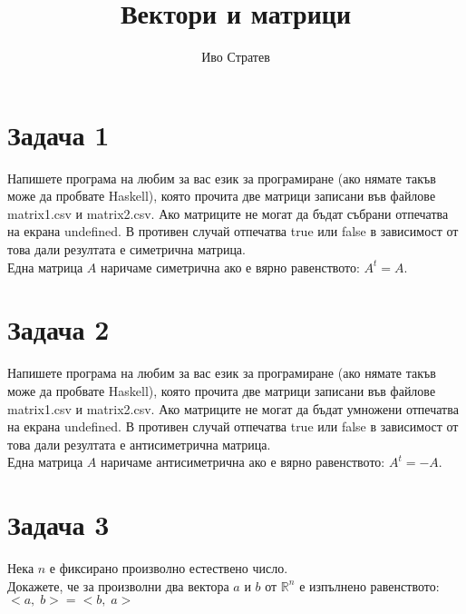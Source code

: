 \documentclass[12pt]{article}
\title{Вектори и матрици}
\author{Иво Стратев}
\newcommand{\R}{\mathbb{R}}
\begin{document}
\maketitle

\section*{Задача 1}

Напишете програма на любим за вас език за програмиране (ако нямате такъв може да пробвате Haskell),
която прочита две матрици записани във файлове matrix1.csv и matrix2.csv. Ако матриците не могат да бъдат събрани
отпечатва на екрана undefined. В противен случай отпечатва true или false в зависимост от това дали
резултата е симетрична матрица. \\

Една матрица $A$ наричаме симетрична ако е вярно равенството: $A^t = A$.

\section*{Задача 2}

Напишете програма на любим за вас език за програмиране (ако нямате такъв може да пробвате Haskell),
която прочита две матрици записани във файлове matrix1.csv и matrix2.csv. Ако матриците не могат да бъдат умножени
отпечатва на екрана undefined. В противен случай отпечатва true или false в зависимост от това дали
резултата е антисиметрична матрица. \\

Една матрица $A$ наричаме антисиметрична ако е вярно равенството: $A^t = -A$.

\section*{Задача 3}

Нека $n$ е фиксирано произволно естествено число. \\

Докажете, че за произволни два вектора $a$ и $b$ от $\R^n$ е изпълнено равенството: \\

$<a, \; b> = <b, \; a>$
\end{document}
